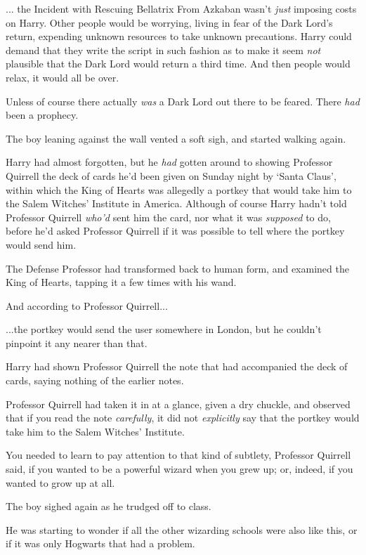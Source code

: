 ... the Incident with Rescuing Bellatrix From Azkaban wasn't \emph{just} imposing costs on Harry. Other people would be worrying, living in fear of the Dark Lord's return, expending unknown resources to take unknown precautions. Harry could demand that they write the script in such fashion as to make it seem \emph{not} plausible that the Dark Lord would return a third time. And then people would relax, it would all be over.

Unless of course there actually \emph{was} a Dark Lord out there to be feared. There \emph{had} been a prophecy.

The boy leaning against the wall vented a soft sigh, and started walking again.

Harry had almost forgotten, but he \emph{had} gotten around to showing Professor Quirrell the deck of cards he'd been given on Sunday night by `Santa Claus', within which the King of Hearts was allegedly a portkey that would take him to the Salem Witches' Institute in America. Although of course Harry hadn't told Professor Quirrell \emph{who'd} sent him the card, nor what it was \emph{supposed} to do, before he'd asked Professor Quirrell if it was possible to tell where the portkey would send him.

The Defense Professor had transformed back to human form, and examined the King of Hearts, tapping it a few times with his wand.

And according to Professor Quirrell...

...the portkey would send the user somewhere in London, but he couldn't pinpoint it any nearer than that.

Harry had shown Professor Quirrell the note that had accompanied the deck of cards, saying nothing of the earlier notes.

Professor Quirrell had taken it in at a glance, given a dry chuckle, and observed that if you read the note \emph{carefully}, it did not \emph{explicitly} say that the portkey would take him to the Salem Witches' Institute.

You needed to learn to pay attention to that kind of subtlety, Professor Quirrell said, if you wanted to be a powerful wizard when you grew up; or, indeed, if you wanted to grow up at all.

The boy sighed again as he trudged off to class.

He was starting to wonder if all the other wizarding schools were also like this, or if it was only Hogwarts that had a problem.
